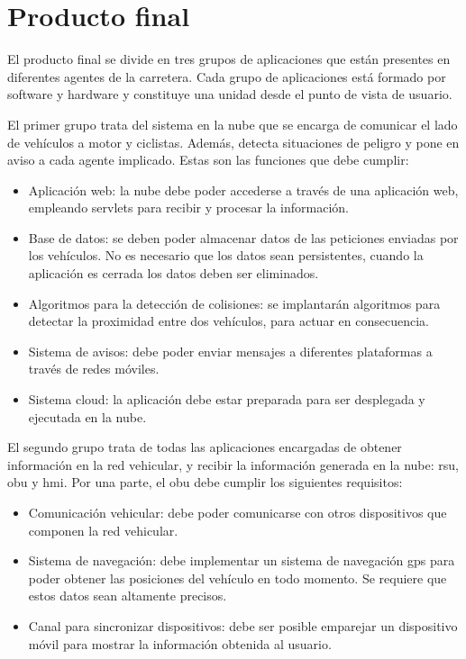 \section{Producto final}
El producto final se divide en tres grupos de aplicaciones que están presentes
en diferentes agentes de la carretera. Cada grupo de aplicaciones está formado
por software y hardware y constituye una unidad desde el punto de vista de
usuario.

El primer grupo trata del sistema en la nube que se encarga de comunicar el
lado de vehículos a motor y ciclistas. Además, detecta situaciones de peligro y
pone en aviso a cada agente implicado. Estas son las funciones que debe cumplir:
\begin{itemize}
	\item Aplicación web: la nube debe poder accederse a través de una aplicación
	web, empleando servlets para recibir y procesar la información.

	\item Base de datos: se deben poder almacenar datos de las peticiones enviadas
	por los vehículos. No es necesario que los datos sean persistentes, cuando la
	aplicación es cerrada los datos deben ser eliminados.

	\item Algoritmos para la detección de colisiones: se implantarán algoritmos
	para detectar la proximidad entre dos vehículos, para actuar en consecuencia.

	\item Sistema de avisos: debe poder enviar mensajes a diferentes plataformas
	a través de redes móviles.

	\item Sistema cloud: la aplicación debe estar preparada para ser desplegada
	y ejecutada en la nube.
\end{itemize}

El segundo grupo trata de todas las aplicaciones encargadas de obtener
información en la red vehicular, y recibir la información generada en la nube:
\gls{rsu}, \gls{obu} y \gls{hmi}. Por una parte, el \gls{obu} debe cumplir los
siguientes requisitos:

\begin{itemize}
	\item Comunicación vehicular: debe poder comunicarse con otros dispositivos
	que	componen la red vehicular.

	\item Sistema de navegación: debe implementar un sistema de navegación
	\gls{gps} para poder obtener las posiciones del vehículo en todo momento. Se
	requiere que estos datos sean altamente precisos.

	\item Canal para sincronizar dispositivos: debe ser posible emparejar un
	dispositivo móvil para mostrar la información obtenida al usuario.
\end{itemize}

